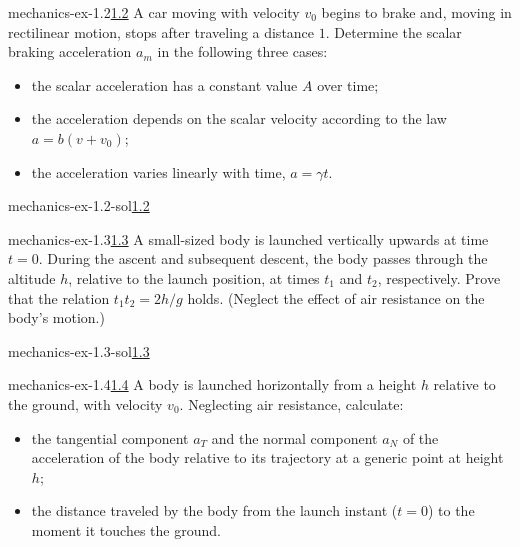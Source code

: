 \documentclass[preview]{standalone}
\begin{document}
\begin{snippetexercise}{mechanics-ex-1.2}{\underline{1.2}}
    A car moving with velocity \(v_0\) begins to brake and, moving in rectilinear motion, stops after traveling a distance \(1\).
    Determine the scalar braking acceleration \(a_m\) in the following three cases:
    \begin{itemize}
        \item the scalar acceleration has a constant value \(A\) over time;
        \item the acceleration depends on the scalar velocity according to the law \(a = b(v + v_0)\);
        \item the acceleration varies linearly with time, \(a = \gamma t\).
    \end{itemize}
\end{snippetexercise}

\begin{snippetsolution}{mechanics-ex-1.2-sol}{\underline{1.2}}
    \todo
\end{snippetsolution}

\begin{snippetexercise}{mechanics-ex-1.3}{\underline{1.3}}
    A small-sized body is launched vertically upwards at time \(t = 0\).
    During the ascent and subsequent descent, the body passes through the altitude \( h \),
    relative to the launch position, at times \( t_1 \) and \( t_2 \), respectively.
    Prove that the relation \( t_1 t_2 = 2h/g \) holds.
    (Neglect the effect of air resistance on the body's motion.)
\end{snippetexercise}

\begin{snippetsolution}{mechanics-ex-1.3-sol}{\underline{1.3}}
    \todo
\end{snippetsolution}

\begin{snippetexercise}{mechanics-ex-1.4}{\underline{1.4}}
    A body is launched horizontally from a height \( h \) relative to the ground, with velocity \( v_0 \). Neglecting air resistance, calculate:
    \begin{itemize}
        \item the tangential component \( a_T \) and the normal component \( a_N \) of the acceleration of the body relative to its trajectory at a generic point at height \( h \);
        \item the distance traveled by the body from the launch instant (\( t = 0 \)) to the moment it touches the ground.
    \end{itemize}
\end{snippetexercise}
\end{document}
